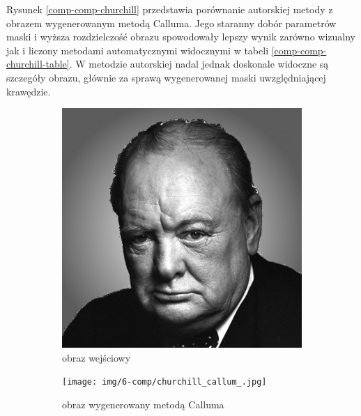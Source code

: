 \documentclass[a4paper, 12pt, polish, twoside]{extreport}
\begin{document}
	Rysunek \ref{comp-comp-churchill} przedstawia porównanie autorskiej metody z obrazem wygenerowanym metodą Calluma. Jego staranny dobór parametrów maski i wyższa rozdzielczość obrazu spowodowały lepszy wynik zarówno wizualny jak i liczony metodami automatycznymi widocznymi w tabeli \ref{comp-comp-churchill-table}. W metodzie autorskiej nadal jednak doskonale widoczne są szczegóły obrazu, głównie za sprawą wygenerowanej maski uwzględniającej krawędzie.
	\begin{figure}[H] 
    \centering
    \begin{subfigure}{0.30\textwidth}
        \centering
        \includegraphics[width = \textwidth]{img/6-comp/churchill_original_c10_inv0.png}
        \caption{obraz wejściowy}
        \label{comp-comp-churchill-a}
    \end{subfigure}
    \begin{subfigure}{0.30\textwidth}
        \centering
        \texttt{[image: img/6-comp/churchill\_callum\_.jpg]}
        \caption{obraz wygenerowany metodą Calluma}
        \label{comp-comp-churchill-b}
    \end{subfigure}\\
    \begin{subfigure}{0.30\textwidth}
        \centering

\end{subfigure}
\end{figure}
\end{document}
